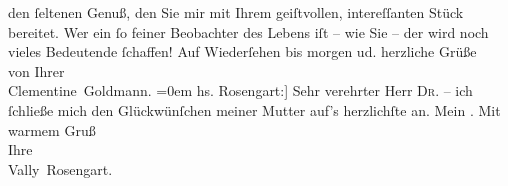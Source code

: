 \begin{ledgroupsized}[t]{13cm}
               den ſeltenen Genuß, den Sie mir mit Ihrem geiſtvollen, {\pb}intereſſanten Stück
               bereitet. Wer ein ſo feiner Beobachter des Lebens iſt – wie Sie – der wird noch
               vieles Bedeutende ſchaffen!\pend
           \pstart
           Auf Wiederſehen bis morgen ud. herzliche Grüße{\\[\baselineskip]}von Ihrer{\\[\baselineskip]}\spacefill\mbox{Clementine Goldmann.}\pend
           \leftskip=0em{}\pstart
           \noindent{}{[}hs. Rosengart:{]} Sehr verehrter Herr \textsc{Dr}. –
               ich ſchließe mich den Glückwünſchen meiner Mutter auf’s herzlichſte an. Mein \label{K_L02795-8v}\label{K_L02795-8h}. Mit warmem Gruß{\\}Ihre{\\}\spacefill\mbox{Vally Rosengart.}\pend
           
         
         \endnumbering{}\end{ledgroupsized}  \newcommand{\dateiname}{L02795}\newcommand{\titel}{Clementine Goldmann und Vally Rosengart an Arthur Schnitzler, [11. 1. 1896]}\newcommand{\editorInnen}{Martin Anton Müller und Laura Untner}
      